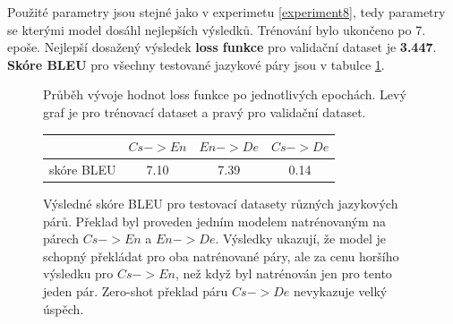 Použité parametry jsou stejné jako v experimetu \ref{experiment8}, tedy parametry se kterými model dosáhl nejlepších výsledků. Trénování bylo ukončeno po 7. epoše. Nejlepší dosažený výsledek \textbf{loss funkce} pro validační dataset je \textbf{3.447}. \textbf{Skóre BLEU} pro všechny testované jazykové páry jsou v tabulce \ref{table:resultsMulti}.

\begin{figure}[H]
    \begin{center}
    \end{center}
	\caption{Průběh vývoje hodnot loss funkce po jednotlivých epochách. Levý graf je pro trénovací dataset a pravý pro validační dataset.}
\end{figure}

\begin{figure}[H]
    \begin{center}
        \begin{tabular}{c|c|c|c}
          & $Cs->En$ & $En->De$ & $Cs->De$ \\
          \hline
          skóre BLEU & 7.10 & 7.39 & 0.14 \\
          \hline
        \end{tabular}
    \end{center}
	\caption{Výsledné skóre BLEU pro testovací datasety různých jazykových párů. Překlad byl proveden jedním modelem natrénovaným na párech $Cs->En$ a $En->De$. Výsledky ukazují, že model je schopný překládat pro oba natrénované páry, ale za cenu horšího výsledku pro $Cs->En$, než když byl natrénován jen pro tento jeden pár. Zero-shot překlad páru $Cs->De$ nevykazuje velký úspěch.}
	\label{table:resultsMulti}
\end{figure}


